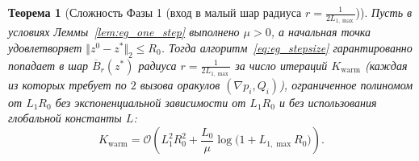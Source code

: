 \documentclass[11pt, a4paper]{article}
\newtheorem{theorem}{Теорема}[section]
\theoremstyle{definition}
\begin{document}
\begin{theorem}[Сложность Фазы 1 (вход в малый шар радиуса $r = \frac{1}{2 L_{1,\max}}$)]\label{thm:phase1_burnin}
Пусть в условиях Леммы~\ref{lem:eg_one_step} выполнено $\mu > 0$, а начальная точка удовлетворяет $\Vert z^0 - z^* \Vert_2 \le R_0$. Тогда алгоритм~\eqref{eq:eg_stepsize} гарантированно попадает в шар $\overline{B}_r(z^*)$ радиуса $r = \frac{1}{2 L_{1,\max}}$ за число итераций $K_{\mathrm{warm}}$ (каждая из которых требует по $2$ вызова оракулов $(\nabla p_i, Q_i)$), ограниченное полиномом от $L_1 R_0$ без экспоненциальной зависимости от $L_1 R_0$ и без использования глобальной константы $L$:
\begin{equation}\label{eq:phase1_complexity}
K_{\mathrm{warm}} = \mathcal{O}\!\left(L_1^2 R_0^2 + \frac{L_0}{\mu} \log\big(1 + L_{1,\max} R_0\big)\right).
\end{equation}
\end{theorem}
\end{document}
